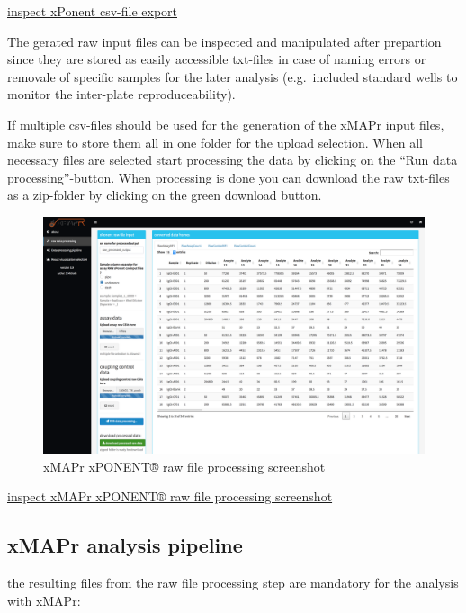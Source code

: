 \documentclass[
]{book}
\begin{document}
\href{figures/xMAPr_analysis_workflow.png}{inspect xPonent csv-file export}

The gerated raw input files can be inspected and manipulated after prepartion since they are stored as easily accessible txt-files in case of naming errors or removale of specific samples for the later analysis (e.g.~included standard wells to monitor the inter-plate reproduceability).

If multiple csv-files should be used for the generation of the xMAPr input files, make sure to store them all in one folder for the upload selection. When all necessary files are selected start processing the data by clicking on the ``Run data processing''-button. When processing is done you can download the raw txt-files as a zip-folder by clicking on the green download button.

\begin{figure}

{\centering \includegraphics[width=50.58in]{figures/xPONENT_raw_file_processing} 

}

\caption{xMAPr xPONENT® raw file  processing screenshot}\label{fig:xMAPrxPONENT}
\end{figure}

\href{figures/xPONENT_raw_file_processing.png}{inspect xMAPr xPONENT® raw file processing screenshot}

\subsection{xMAPr analysis pipeline}\label{xmapr-analysis-pipeline}

the resulting files from the raw file processing step are mandatory for the analysis with xMAPr:
\end{document}
